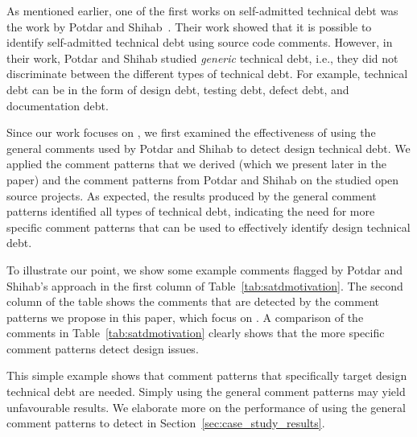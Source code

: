 As mentioned earlier, one of the first works on self-admitted technical debt was the work by Potdar and Shihab~\cite{Potdar2014ICSME}. Their work showed that it is possible to identify self-admitted technical debt using source code comments. However, in their work, Potdar and Shihab studied \textit{generic} technical debt, i.e., they did not discriminate between the different types of technical debt. For example, technical debt can be in the form of design debt, testing debt, defect debt, and documentation debt. 

Since our work focuses on \SADTD, we first examined the effectiveness of using the general comments used by Potdar and Shihab to detect design technical debt. We applied the comment patterns that we derived (which we present later in the paper) and the comment patterns from Potdar and Shihab on the studied open source projects. As expected, the results produced by the general comment patterns identified all types of technical debt, indicating the need for more specific comment patterns that can be used to effectively identify design technical debt.

To illustrate our point, we show some example comments flagged by Potdar and Shihab's approach in the first column of Table~\ref{tab:satdmotivation}. The second column of the table shows the comments that are detected by the comment patterns we propose in this paper, which focus on \SADTD. A comparison of the comments in Table~\ref{tab:satdmotivation} clearly shows that the more specific comment patterns detect design issues. 

This simple example shows that comment patterns that specifically target design technical debt are needed. Simply using the general comment patterns may yield unfavourable results. We elaborate more on the performance of using the general comment patterns to detect \SADTD in Section~\ref{sec:case_study_results}.

